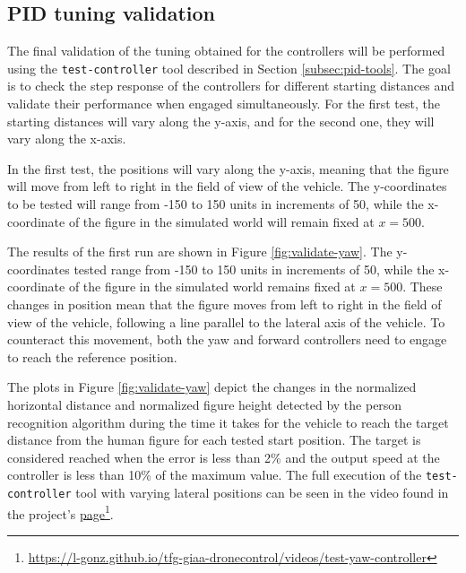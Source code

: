 \subsection{PID tuning validation}
\label{subsec:pid-test-controller}

The final validation of the tuning obtained for the controllers will be performed using the \texttt{test-controller} tool described in Section \ref{subsec:pid-tools}. The goal is to check the step response of the controllers for different starting distances and validate their performance when engaged simultaneously. For the first test, the starting distances will vary along the y-axis, and for the second one, they will vary along the x-axis.

In the first test, the positions will vary along the y-axis, meaning that the figure will move from left to right in the field of view of the vehicle. The y-coordinates to be tested will range from -150 to 150 units in increments of 50, while the x-coordinate of the figure in the simulated world will remain fixed at $x=500$.

The results of the first run are shown in Figure \ref{fig:validate-yaw}. The y-coordinates tested range from -150 to 150 units in increments of 50, while the x-coordinate of the figure in the simulated world remains fixed at $x=500$. These changes in position mean that the figure moves from left to right in the field of view of the vehicle, following a line parallel to the lateral axis of the vehicle. To counteract this movement, both the yaw and forward controllers need to engage to reach the reference position.

The plots in Figure \ref{fig:validate-yaw} depict the changes in the normalized horizontal distance and normalized figure height detected by the person recognition algorithm during the time it takes for the vehicle to reach the target distance from the human figure for each tested start position. The target is considered reached when the error is less than 2\% and the output speed at the controller is less than 10\% of the maximum value. The full execution of the \texttt{test-controller} tool with varying lateral positions can be seen in the video found in the project's \href{https://l-gonz.github.io/tfg-giaa-dronecontrol/videos/test-yaw-controller}{page}\footnote{\url{https://l-gonz.github.io/tfg-giaa-dronecontrol/videos/test-yaw-controller}}.

